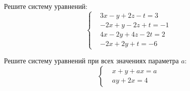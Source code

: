 %
%



\begin{problems}

\item
Решите систему уравнений:
\[\left\{\begin{aligned}&
     3x  -y +2z  -t =  3
\\&
    -2x  +y -2z  +t = -1
\\&
     4x -2y +4z -2t =  2
\\&
    -2x +2y      +t = -6
\end{aligned}\right.\]

\item
Решите систему уравнений при всех значениях параметра ${a}$:
\[\left\{\begin{aligned}&
    x + y + {a} x = {a}
\\&
    {a} y + 2 x = 4
\end{aligned}\right.\]

\end{problems}


